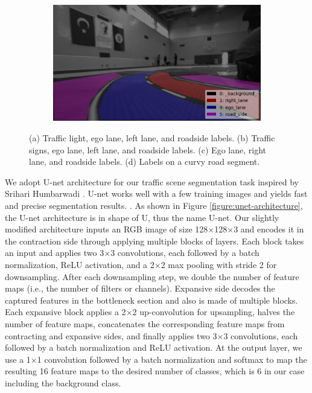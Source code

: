 \begin{figure}[h]
\begin{subfigure}[b]{0.47\linewidth}
    \caption{}
  \end{subfigure}
  \begin{subfigure}[b]{0.47\linewidth}
    \includegraphics[width=\linewidth]{figures/label-visualization4.jpg}
    \caption{}
  \end{subfigure}
  \caption[Visualization of semantic segmentation labels]{(a) Traffic light,
    ego lane, left lane, and roadside labels. (b) Traffic signs, ego lane, left
    lane, and roadside labels. (c) Ego lane, right lane, and roadside labels.
    (d) Labels on a curvy road segment.}
  \label{figure:label-visualization}
\end{figure}

We adopt U-net architecture for our traffic scene segmentation task inspired
by Srihari Humbarwadi \cite{Srihari2018SS}. U-net works well with a few
training images and yields fast and precise segmentation results.
\cite{Ronneberger2015UNetCN}. As shown in Figure
\ref{figure:unet-architecture}, the U-net architecture is in shape of U, thus
the name U-net. Our slightly modified architecture inputs an RGB image of size
128$\times$128$\times$3 and encodes it in the contraction side through applying
multiple blocks of layers. Each block takes an input and applies two 3$\times$3
convolutions, each followed by a batch normalization, ReLU activation, and a
2$\times$2 max pooling with stride 2 for downsampling. After each downsampling
step, we double the number of feature maps (i.e., the number of filters or
channels). Expansive side decodes the captured features in the bottleneck
section and also is made of multiple blocks. Each expansive block applies a
2$\times$2 up-convolution for upsampling, halves the number of feature maps,
concatenates the corresponding feature maps from contracting and expansive
sides, and finally applies two 3$\times$3 convolutions, each followed by a
batch normalization and ReLU activation. At the output layer, we use a
1$\times$1 convolution followed by a batch normalization and softmax to map the
resulting 16 feature maps to the desired number of classes, which is 6 in our
case including the background class.

